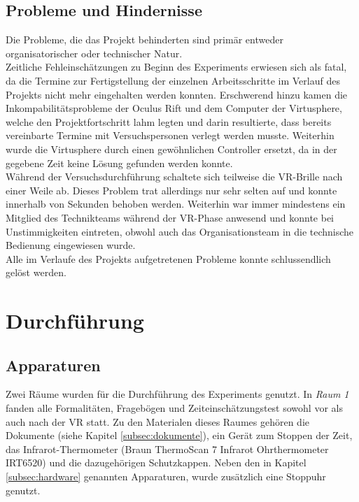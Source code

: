 \documentclass{Bericht}
\begin{document}
\subsection{Probleme und Hindernisse}
Die Probleme, die das Projekt behinderten sind primär entweder organisatorischer oder technischer Natur.\\
Zeitliche Fehleinschätzungen zu Beginn des Experiments erwiesen sich als fatal, da die Termine zur Fertigstellung der einzelnen Arbeitsschritte im Verlauf des Projekts nicht mehr eingehalten werden konnten.
Erschwerend hinzu kamen die Inkompabilitätsprobleme der Oculus Rift und dem Computer der Virtusphere, welche den Projektfortschritt lahm legten und darin resultierte, dass bereits vereinbarte Termine mit Versuchspersonen verlegt werden musste. Weiterhin wurde die Virtusphere durch einen gewöhnlichen Controller ersetzt, da in der gegebene Zeit keine Lösung gefunden werden konnte.\\
	Während der Versuchsdurchführung schaltete sich teilweise die VR-Brille nach einer Weile ab. Dieses Problem trat allerdings nur sehr selten auf und konnte innerhalb von Sekunden behoben werden. Weiterhin war immer mindestens ein Mitglied des Technikteams während der VR-Phase anwesend und konnte bei Unstimmigkeiten eintreten, obwohl auch das Organisationsteam in die technische Bedienung eingewiesen wurde.\\
	Alle im Verlaufe des Projekts aufgetretenen Probleme konnte schlussendlich gelöst werden.
				

\section{Durchführung}
\subsection{Apparaturen}



Zwei Räume wurden für die Durchführung des Experiments genutzt. In  \textit{Raum 1} fanden alle Formalitäten, Fragebögen und Zeiteinschätzungstest sowohl vor als auch nach der VR statt. Zu den Materialen dieses Raumes gehören die Dokumente (siehe Kapitel \ref{subsec:dokumente}), ein Gerät zum Stoppen der Zeit, das Infrarot-Thermometer (Braun ThermoScan 7 Infrarot Ohrthermometer IRT6520) und die dazugehörigen Schutzkappen. Neben den in Kapitel \ref{subsec:hardware} genannten Apparaturen, wurde zusätzlich eine Stoppuhr genutzt. 


\label{subsec:dokumente}
\end{document}
